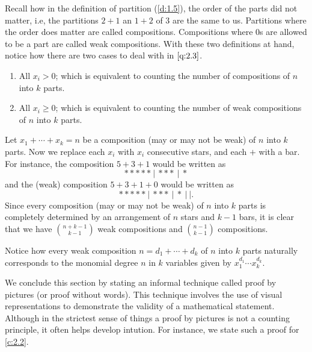 \begin{solution}
Recall how in the definition of partition (\cref{d:1.5}), the order of the parts did not matter, i.e, the partitions $2+1$ an $1+2$ of $3$ are the same to us. Partitions where the order does matter are called compositions. Compositions where $0$s are allowed to be a part are called weak compositions. With these two definitions at hand, notice how there are two cases to deal with in $\cref{q:2.3}$.
\begin{enumerate}
    \item All $x_{i}>0$; which is equivalent to counting the number of compositions of $n$ into $k$ parts.
    \item All $x_{i}\geq 0$; which is equivalent to counting the number of weak compositions of $n$ into $k$ parts.
\end{enumerate}
Let $x_1+\cdots+x_k=n$ be a composition (may or may not be weak) of $n$ into $k$ parts. Now we replace each $x_i$ with $x_i$ consecutive stars, and each $+$ with a bar. For instance, the composition $5+3+1$ would be written as \[
***** \ | \ *** \ | \ *
\] and the (weak) composition $5+3+1+0$ would be written as 
\[
***** \ | \ *** \ | \ * \ | \ |.
\]
Since every composition (may or may not be weak) of $n$ into $k$ parts is completely determined by an arrangement of $n$ stars and $k-1$ bars, it is clear that we have $\binom{n+k-1}{k-1}$ weak compositions and $\binom{n-1}{k-1}$ compositions.
\end{solution}
\begin{remark}
Notice how every weak composition $n=d_1+\cdots+d_k$ of $n$ into $k$ parts naturally corresponds to the monomial degree $n$ in $k$ variables given by $x_1^{d_1}\cdots x_k^{d_k}$.
\end{remark}
We conclude this section by stating an informal technique called proof by pictures (or proof without words). This technique involves the use of visual representations to demonstrate the validity of a mathematical statement. Although in the strictest sense of things a proof by pictures is not a counting principle, it often helps develop intution. For instance, we state such a proof for \cref{c:2.2}. 
